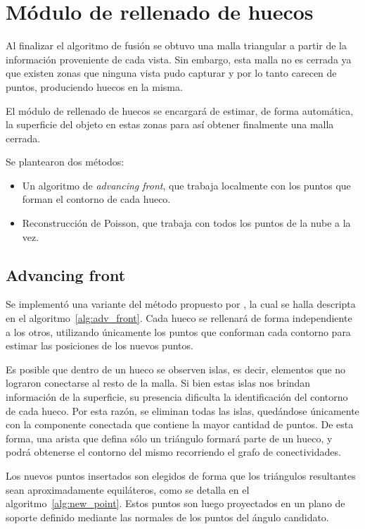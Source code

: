 \section{Módulo de rellenado de huecos}
	Al finalizar el algoritmo de fusión se obtuvo una malla triangular a partir
	de la información proveniente de cada vista.
	Sin embargo, esta malla no es cerrada ya que existen zonas que ninguna
	vista pudo capturar y por lo tanto carecen de puntos, produciendo huecos en la misma.

	El módulo de rellenado de huecos se encargará de estimar, de forma automática, la superficie del
	objeto en estas zonas para así obtener finalmente una malla cerrada.

	Se plantearon dos métodos:
	\begin{itemize}
		\item Un algoritmo de \emph{advancing front}, que trabaja localmente con los puntos que forman el contorno de cada hueco.
		\item Reconstrucción de Poisson, que trabaja con todos los puntos de la nube a la vez. 
	\end{itemize}


	\subsection{Advancing front}
		Se implementó una variante del método propuesto por \cite{advance_front},
		la cual se halla descripta en el algoritmo~\ref{alg:adv_front}.
		Cada hueco se rellenará de forma independiente a los otros,
		utilizando únicamente los puntos que conforman cada contorno para estimar
		las posiciones de los nuevos puntos.

		Es posible que dentro de un hueco se observen islas, es decir,
		elementos que no lograron conectarse al resto de la malla.
		Si bien estas islas nos brindan información de la superficie,
		su presencia dificulta la identificación del contorno de cada hueco.
		Por esta razón, se eliminan todas las islas,
		quedándose únicamente con la componente conectada que contiene
		la mayor cantidad de puntos.
		De esta forma, una arista que defina sólo un triángulo formará parte de un hueco,
		y podrá obtenerse el contorno del mismo recorriendo el grafo de conectividades. 


		Los nuevos puntos insertados son elegidos de forma que los triángulos resultantes sean
		aproximadamente equiláteros, como se detalla en el algoritmo~\ref{alg:new_point}.
		Estos puntos son luego proyectados en un plano de soporte definido
		mediante las normales de los puntos del ángulo candidato.

